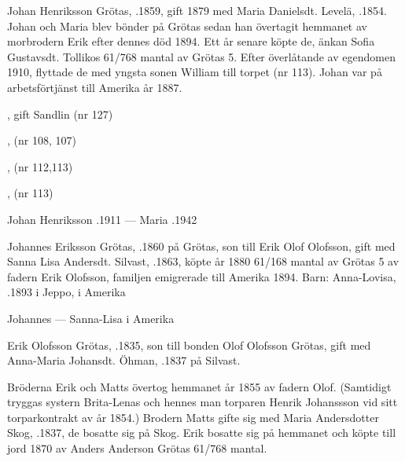 Johan Henriksson Grötas, .1859, gift 1879 med Maria Danielsdt. Levelä, .1854. Johan och Maria blev bönder på Grötas sedan han övertagit hemmanet av morbrodern Erik efter dennes död 1894. Ett år senare köpte de, änkan Sofia Gustavsdt. Tollikos 61/768 mantal av Grötas 5.  Efter överlåtande av egendomen 1910, flyttade de med yngsta sonen William till torpet (nr 113). Johan var på arbetsförtjänst till Amerika år 1887.
\begin{jhchildren}
  \item {}, gift Sandlin (nr 127)
  \item {}, (nr 108, 107)
  \item {}, (nr 112,113)
  \item {}
  \item {}, (nr 113)
\end{jhchildren}

Johan Henriksson .1911  ---  Maria .1942


Johannes Eriksson Grötas, .1860 på Grötas, son till Erik Olof Olofsson, gift med Sanna Lisa Andersdt. Silvast, .1863, köpte år 1880 61/168 mantal av Grötas 5 av fadern Erik Olofsson,  familjen emigrerade till Amerika 1894.
Barn: Anna-Lovisa, .1893 i Jeppo,  i Amerika

Johannes   ---  Sanna-Lisa  i Amerika


Erik Olofsson Grötas, .1835, son till bonden Olof Olofsson Grötas, gift med Anna-Maria Johansdt. Öhman, .1837 på Silvast.

Bröderna Erik och Matts övertog hemmanet år 1855 av fadern Olof. (Samtidigt tryggas systern Brita-Lenas och hennes man torparen Henrik Johanssson vid sitt torparkontrakt av år 1854.) Brodern Matts gifte sig med Maria Andersdotter Skog, .1837, de bosatte sig på Skog. Erik bosatte sig på hemmanet och köpte till jord 1870 av Anders Anderson Grötas 61/768 mantal.

